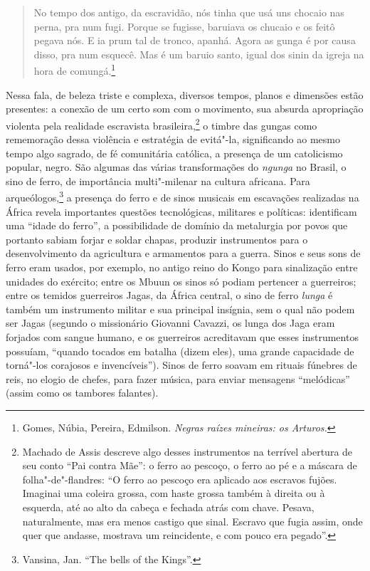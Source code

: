 \begin{quote}
No tempo dos antigo, da escravidão, nós tinha que usá uns chocaio nas
perna, pra num fugi. Porque se fugisse, baruiava os chucaio e os feitô
pegava nós. E ia prum tal de tronco, apanhá. Agora as gunga é por causa
disso, pra num esquecê. Mas é um baruio santo, igual dos sinin da igreja
na hora de comungá.\footnote{Gomes, Núbia, Pereira, Edmilson.
  \emph{Negras raízes mineiras: os Arturos.}}
\end{quote}

Nessa fala, de beleza triste e complexa, diversos tempos, planos e
dimensões estão presentes: a conexão de um certo som com o movimento,
sua absurda apropriação violenta pela realidade escravista
brasileira,\footnote{Machado de Assis descreve algo desses instrumentos
  na terrível abertura de seu conto ``Pai contra Mãe'': o ferro ao
  pescoço, o ferro ao pé e a máscara de folha"-de"-flandres: ``O ferro ao
  pescoço era aplicado aos escravos fujões. Imaginai uma coleira grossa,
  com haste grossa também à direita ou à esquerda, até ao alto da cabeça
  e fechada atrás com chave. Pesava, naturalmente, mas era menos castigo
  que sinal. Escravo que fugia assim, onde quer que andasse, mostrava um
  reincidente, e com pouco era pegado''.} o timbre das gungas como
rememoração dessa violência e estratégia de evitá"-la, significando ao
mesmo tempo algo sagrado, de fé comunitária católica, a presença de um
catolicismo popular, negro. São algumas das várias transformações do
\emph{ngunga} no Brasil, o sino de ferro, de importância multi"-milenar
na cultura africana. Para arqueólogos,\footnote{Vansina, Jan. ``The
  bells of the Kings''.} a presença do ferro e de sinos musicais em
escavações realizadas na África revela importantes questões
tecnológicas, militares e políticas: identificam uma ``idade do ferro'',
a possibilidade de domínio da metalurgia por povos que portanto sabiam
forjar e soldar chapas, produzir instrumentos para o desenvolvimento da
agricultura e armamentos para a guerra. Sinos e seus sons de ferro eram
usados, por exemplo, no antigo reino do Kongo para sinalização entre
unidades do exército; entre os Mbuun os sinos só podiam pertencer a
guerreiros; entre os temidos guerreiros Jagas, da África central, o sino
de ferro \emph{lunga} é também um instrumento militar e sua principal
insígnia, sem o qual não podem ser Jagas (segundo o missionário Giovanni
Cavazzi, os lunga dos Jaga eram forjados com sangue humano, e os
guerreiros acreditavam que esses instrumentos possuíam, ``quando tocados
em batalha (dizem eles), uma grande capacidade de torná"-los corajosos e
invencíveis''). Sinos de ferro soavam em rituais fúnebres de reis, no
elogio de chefes, para fazer música, para enviar mensagens ``melódicas''
(assim como os tambores falantes).

